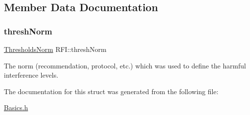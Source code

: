 \subsection{Member Data Documentation}
\mbox{\label{structRFI_a48905b3dcebf7127bd31315a21a24599}} 
\subsubsection{\texorpdfstring{thresh\+Norm}{threshNorm}}
{\footnotesize\ttfamily \hyperlink{structRFI_a18cfa7d24274bbcd14acc6b513860cb0}{Thresholds\+Norm} R\+F\+I\+::thresh\+Norm}

The norm (recommendation, protocol, etc.) which was used to define the harmful interference levels. 

The documentation for this struct was generated from the following file\+:\begin{DoxyCompactItemize}
\item 
\hyperlink{Basics_8h}{Basics.\+h}\end{DoxyCompactItemize}
